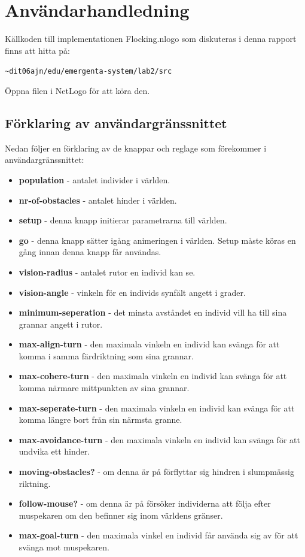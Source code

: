 \documentclass[titlepage, a4paper, 12pt]{article}
\begin{document}
\section{Användarhandledning}
Källkoden till implementationen Flocking.nlogo som diskuteras i denna
rapport finns att hitta på:

\verb!~dit06ajn/edu/emergenta-system/lab2/src!

Öppna filen i NetLogo för att köra den.

\subsection{Förklaring av användargränssnittet}
Nedan följer en förklaring av de knappar och reglage som förekommer i
användargränssnittet:

\begin{itemize}
\item \textbf{population} - antalet individer i världen.
\item \textbf{nr-of-obstacles} - antalet hinder i världen.
\item \textbf{setup} - denna knapp initierar parametrarna till världen.
\item \textbf{go} - denna knapp sätter igång animeringen i
  världen. Setup måste köras en gång innan denna knapp får användas.
\item \textbf{vision-radius} - antalet rutor en individ kan se.
\item \textbf{vision-angle} - vinkeln för en individs synfält angett i
  grader.
\item \textbf{minimum-seperation} - det minsta avståndet en individ
  vill ha till sina grannar angett i rutor.
\item \textbf{max-align-turn} - den maximala vinkeln en individ kan
  svänga för att komma i samma färdriktning som sina grannar.
\item \textbf{max-cohere-turn} - den maximala vinkeln en individ kan
  svänga för att komma närmare mittpunkten av sina grannar.
\item \textbf{max-seperate-turn} - den maximala vinkeln en individ kan
  svänga för att komma längre bort från sin närmsta granne.
\item \textbf{max-avoidance-turn} - den maximala vinkeln en individ
  kan svänga för att undvika ett hinder.
\item \textbf{moving-obstacles?} - om denna är på förflyttar sig
  hindren i slumpmässig riktning.
\item \textbf{follow-mouse?} - om denna är på försöker individerna att
  följa efter muspekaren om den befinner sig inom världens gränser.
\item \textbf{max-goal-turn} - den maximala vinkel en individ får
  använda sig av för att svänga mot muspekaren.
\end{itemize}
\end{document}
